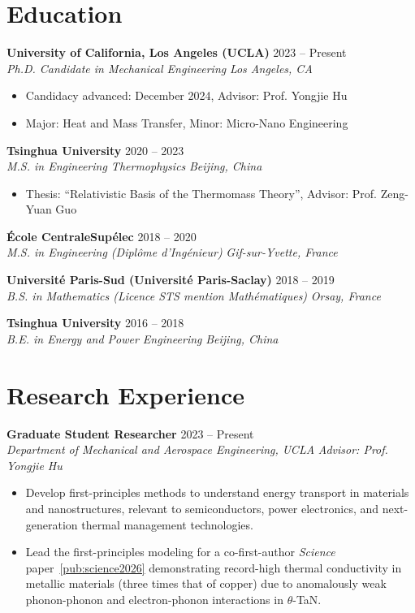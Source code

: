 \documentclass[11pt,letterpaper]{article}
\newcommand{\gap}{\par\addvspace{0.15em}}
\newcommand{\Gap}{\par\addvspace{0.35em}}
\newcommand{\cventrytwoline}[4]{
  \textbf{#1} \hfill #2 \\
  \textit{#3} \hfill \textit{#4}\par
}
\newcommand{\cventry}{\cventrytwoline}
\newcommand{\researchentry}[4]{
  \textbf{#1} \hfill #2 \\
  \textit{#3} \hfill \textit{#4}\par
}
\begin{document}
\section*{Education}
\cventry{University of California, Los Angeles (UCLA)}{2023 -- Present}{Ph.D. Candidate in Mechanical Engineering}{Los Angeles, CA}
\begin{itemize}
  \item Candidacy advanced: December 2024, Advisor: Prof. Yongjie Hu
  \item Major: Heat and Mass Transfer, Minor: Micro-Nano Engineering
\end{itemize}
\gap

\cventry{Tsinghua University}{2020 -- 2023}{M.S. in Engineering Thermophysics}{Beijing, China}
\begin{itemize}
  \item Thesis: ``Relativistic Basis of the Thermomass Theory'', Advisor: Prof. Zeng-Yuan Guo
\end{itemize}
\gap

\cventry{{\'E}cole CentraleSup{\'e}lec}{2018 -- 2020}{M.S. in Engineering (Dipl\^ome d'Ing{\'e}nieur)}{Gif-sur-Yvette, France}
\gap

\cventry{Universit{\'e} Paris-Sud (Universit\'e Paris-Saclay)}{2018 -- 2019}{B.S. in Mathematics (Licence STS mention Math{\'e}matiques)}{Orsay, France}
\gap

\cventry{Tsinghua University}{2016 -- 2018}{B.E. in Energy and Power Engineering}{Beijing, China}
\Gap

\section*{Research Experience}
\researchentry{Graduate Student Researcher}{2023 -- Present}{Department of Mechanical and Aerospace Engineering, UCLA}{Advisor: Prof. Yongjie Hu}
\begin{itemize}
  \item Develop first-principles methods to understand energy transport in materials and nanostructures, relevant to semiconductors, power electronics, and next-generation thermal management technologies.
  \item Lead the first-principles modeling for a co-first-author \textit{Science} paper~\cref{pub:science2026} demonstrating record-high thermal conductivity in metallic materials (three times that of copper) due to anomalously weak phonon-phonon and electron-phonon interactions in $\theta$-TaN.
\end{itemize}
\gap
\end{document}

